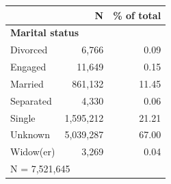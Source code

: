 \begin{tabular}{lrr}
\toprule
 & N & \% of total \\
\midrule
\multicolumn{3}{l}{\textbf{Marital status}}\\ 
\midrule
Divorced            &       6,766&        0.09\\
Engaged             &      11,649&        0.15\\
Married             &     861,132&       11.45\\
Separated           &       4,330&        0.06\\
Single              &   1,595,212&       21.21\\
Unknown             &   5,039,287&       67.00\\
Widow(er)           &       3,269&        0.04\\
\midrule
\multicolumn{3}{l}{\footnotesize N =    7,521,645}\\
\bottomrule
\end{tabular}
